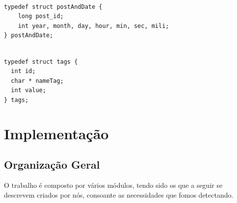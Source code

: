 \documentclass[a4paper]{report}
\begin{document}
\begin{verbatim}

typedef struct postAndDate {
    long post_id;
    int year, month, day, hour, min, sec, mili;
} postAndDate;

\end{verbatim}


\begin{verbatim}

typedef struct tags {
  int id;
  char * nameTag;
  int value;
} tags;

\end{verbatim}




\chapter{Implementação}
\label{ch:implementacao}

\section{Organização Geral}
\label{sec:organizacao}

O trabalho é composto por vários módulos, tendo sido os que a seguir se descrevem
criados por nós, consoante as necessidades que fomos detectando.
\end{document}
